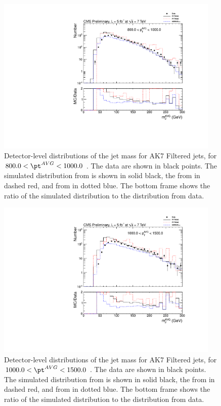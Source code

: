 \begin{figure}[htbp]
\centering
\includegraphics[width=0.95\textwidth]{figs/histAK7MjetVsPtAvg_rawDataMCComparisons_pt_9_Filtered}
\caption{Detector-level distributions of the jet mass for AK7 Filtered jets,
for $800.0 < \pt^{AVG} < 1000.0$ \GeVc. The data are shown in black points.
The simulated distribution from \PYTHIA is shown in solid black, 
the from \PYTHIAEIGHT in dashed red, and from \HERWIG in dotted blue. 
The bottom frame shows the ratio of the simulated distribution
to the distribution from data. 
\label{figs:histAK7MjetVsPtAvg_rawDataMCComparisons_pt_9_Filtered}}
\end{figure}



\begin{figure}[htbp]
\centering
\includegraphics[width=0.95\textwidth]{figs/histAK7MjetVsPtAvg_rawDataMCComparisons_pt_10_Filtered}
\caption{Detector-level distributions of the jet mass for AK7 Filtered jets,
for $1000.0 < \pt^{AVG} < 1500.0$ \GeVc. The data are shown in black points.
The simulated distribution from \PYTHIA is shown in solid black, 
the from \PYTHIAEIGHT in dashed red, and from \HERWIG in dotted blue. 
The bottom frame shows the ratio of the simulated distribution
to the distribution from data. 
\label{figs:histAK7MjetVsPtAvg_rawDataMCComparisons_pt_10_Filtered}}
\end{figure}


